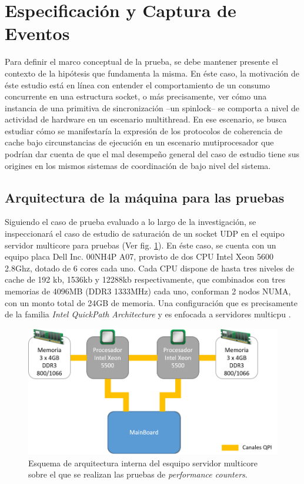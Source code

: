 \section{Especificación y Captura de Eventos}
Para definir el marco conceptual de la prueba, se debe mantener presente el contexto de la hipótesis que fundamenta la misma. En éste caso, la motivación de éste estudio está en línea con entender el comportamiento de un consumo concurrente en una estructura socket, o más precisamente, ver cómo una instancia de una primitiva de sincronización --un spinlock-- se comporta a nivel de actividad de hardware en un escenario multithread. En ese escenario, se busca estudiar cómo se manifestaría la expresión de los protocolos de coherencia de cache bajo circunstancias de ejecución en un escenario mutiprocesador que podrían dar cuenta de que el mal desempeño general del caso de estudio tiene sus origines en los mismos sistemas de coordinación de bajo nivel del sistema.

\subsection{Arquitectura de la máquina para las pruebas}
Siguiendo el caso de prueba evaluado a lo largo de la investigación, se inspeccionará el caso de estudio de saturación de un socket UDP en el equipo servidor multicore para pruebas (Ver fig. \ref{fig:hwspecs}). En éste caso, se cuenta con un equipo placa Dell Inc. 00NH4P A07, provisto de dos CPU Intel Xeon 5600 2.8Ghz, dotado de 6 cores cada uno. Cada CPU dispone de hasta tres niveles de cache de 192 kb, 1536kb y 12288kb respectivamente, que combinados con tres memorias de 4096MB (DDR3 1333MHz) cada uno, conforman 2 nodos NUMA, con un monto total de 24GB de memoria. Una configuración que es precisamente de la familia \emph{Intel QuickPath Architecture} y es enfocada a servidores multicpu \cite{report:intelxeon5600, manual:intelxeon5600}.

\begin{figure}[!h]
	\centering
	\includegraphics[scale=.75]{imagenes/arch24Cores.png}
	\caption{Esquema de arquitectura interna del esquipo servidor multicore sobre el que se realizan las pruebas de \emph{performance counters}.}
	\label{fig:hwspecs}
\end{figure}

